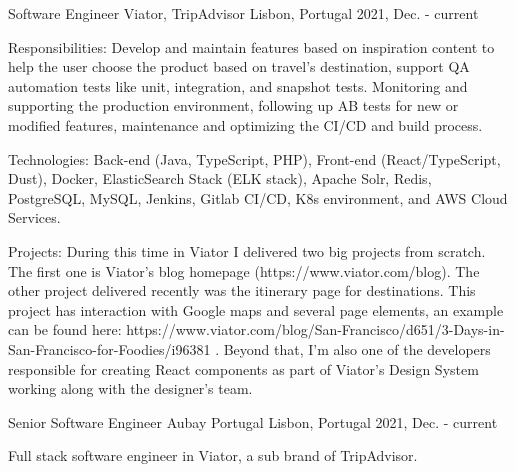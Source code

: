 

\begin{cventries}

  \cventry
    {Software Engineer} %
    {Viator, TripAdvisor} %
    {Lisbon, Portugal} %
    {2021, Dec. - current} %
    {
      \begin{cvitems} %
        \item {Responsibilities: Develop and maintain features based on inspiration content to help the user choose the product based on travel’s destination, support QA automation tests like unit, integration, and snapshot tests. Monitoring and supporting the production environment, following up AB tests for new or modified features, maintenance and optimizing the CI/CD and build process.}
        \item {Technologies: Back-end (Java, TypeScript, PHP), Front-end (React/TypeScript, Dust), Docker, ElasticSearch Stack (ELK stack), Apache Solr, Redis, PostgreSQL, MySQL, Jenkins, Gitlab CI/CD, K8s environment, and AWS Cloud Services.}
        \item {Projects: During this time in Viator I delivered two big projects from scratch. The first one is Viator’s blog homepage (https://www.viator.com/blog). The other project delivered recently was the itinerary page for destinations. This project has interaction with Google maps and several page elements, an example can be found here: https://www.viator.com/blog/San-Francisco/d651/3-Days-in-San-Francisco-for-Foodies/i96381 . Beyond that, I’m also one of the developers responsible for creating React components as part of Viator’s Design System working along with the designer’s team.}
      \end{cvitems}
    }

  \cventry
    {Senior Software Engineer} %
    {Aubay Portugal} %
    {Lisbon, Portugal} %
    {2021, Dec. - current} %
    {
      \begin{cvitems} %
        \item {Full stack software engineer in Viator, a sub brand of TripAdvisor.}
      \end{cvitems}
    }


\end{cventries}
